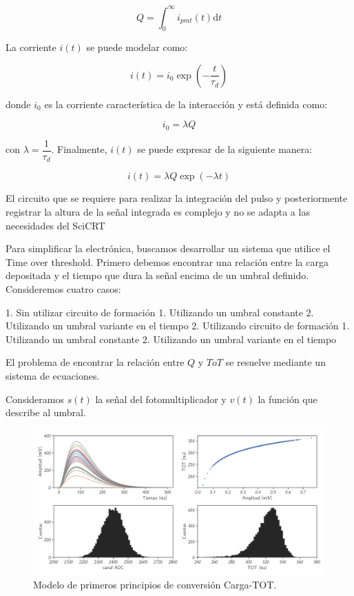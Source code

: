 \begin{equation}
Q=\int_{0}^{\infty} i_{pmt}\left(t\right)\mathrm{d}t
\end{equation}

La corriente $i\left(t\right)$ se puede modelar como:

\begin{equation}
i\left(t\right)=i_{0} \exp\left(-\dfrac{t}{\tau_{d}}\right)
\end{equation}

donde $i_{0}$ es la corriente característica de la interacción y está definida como:

\begin{equation}
i_{0}=\lambda Q
\end{equation}

con $\lambda=\dfrac{1}{\tau_{d}}$. Finalmente, $i\left(t\right)$ se puede expresar de la siguiente manera:

\begin{equation}
i\left(t\right)=\lambda Q \exp\left(-\lambda t\right)
\end{equation}

El circuito que se requiere para realizar la integración del pulso y posteriormente registrar la altura de la señal integrada es complejo y no se adapta a las necesidades del SciCRT

Para simplificar la electrónica, buscamos desarrollar un sistema que utilice el Time over threshold. Primero debemos encontrar una relación entre la carga depositada y el tiempo que dura la señal encima de un umbral definido. Consideremos cuatro casos:

1. Sin utilizar circuito de formación
    1. Utilizando un umbral constante
    2. Utilizando un umbral variante en el tiempo
2. Utilizando circuito de formación
    1. Utilizando un umbral constante
    2. Utilizando un umbral variante en el tiempo

El problema de encontrar la relación entre $Q$ y $ToT$ se resuelve mediante un sistema de ecuaciones.

Consideramos $s\left(t\right)$ la señal del fotomultiplicador y $v\left(t\right)$ la función que describe al umbral.

\begin{figure}
        \centering
        \includegraphics[width=\textwidth]{TOT-model.pdf}
        \caption{Modelo de primeros principios de conversión Carga-TOT.}
        \label{fig:tot-model}
\end{figure}

